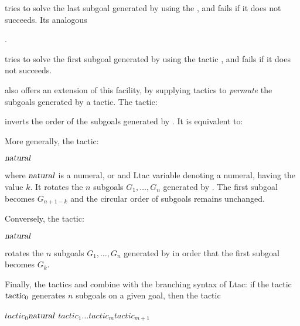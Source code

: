\begin{center}
   
\end{center}

tries to solve the last subgoal generated by  using the
, and fails if it does not succeeds. Its analogous

\begin{center}
   .
\end{center}

tries to solve the first subgoal generated by  using the
tactic , and fails if it does not succeeds.


\ssr{} also offers an extension of this facility, by supplying
tactics to \emph{permute}  the subgoals generated by a tactic.
The tactic:

\begin{center}
  {\tac}
\end{center}

inverts the order of the subgoals generated by {\tac}. It is
equivalent to:

\begin{center}
  {\tac}
\end{center}


More generally, the tactic:

\begin{center}
  {\tac}${\naturalnumber}$ 
\end{center}

where ${\naturalnumber}$ is
a \Coq{} numeral, or and Ltac variable denoting
a \Coq{} numeral, having the value $k$. It
rotates the $n$ subgoals $G_1,
\dots, G_n$ generated by {\tac}. The first subgoal becomes
$G_{n + 1 - k}$ and the circular order of subgoals remains unchanged.

Conversely, the tactic:

  {\tac}${\naturalnumber}$ 

rotates the $n$ subgoals $G_1,
\dots, G_n$ generated by  in order that the first subgoal
becomes $G_{k}$.

Finally, the tactics  and  combine with the
branching syntax of Ltac:
if the tactic $\ssrN[0]{tactic}$ generates $n$
subgoals on a given goal, then the tactic

  $tactic_0$${\naturalnumber}$ \ssrC{[}$tactic_1$\ssrC{|}$\dots$\ssrC{|}$tactic_m$\ssrC{] || }$tactic_{m+1}$

